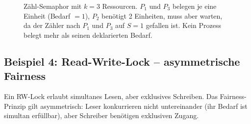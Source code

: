 ﻿\documentclass[a4paper,12pt]{article}
\theoremstyle{definition}
\begin{document}
\begin{figure}[H]
\caption{Zähl-Semaphor mit $k=3$ Ressourcen. $P_1$ und $P_3$ belegen
  je eine Einheit (Bedarf $= 1$), $P_2$ benötigt 2 Einheiten, muss
  aber warten, da der Zähler nach $P_1$ und $P_3$ auf $S=1$ gefallen
  ist. Kein Prozess belegt mehr als seinen deklarierten Bedarf.}
\label{fig:tikz3}
\end{figure}

\subsection{Beispiel 4: Read-Write-Lock -- asymmetrische Fairness}

Ein RW-Lock erlaubt simultanes Lesen, aber exklusives Schreiben.
Das Fairness-Prinzip gilt asymmetrisch: Leser konkurrieren nicht
untereinander (ihr Bedarf ist simultan erfüllbar), aber Schreiber
benötigen exklusiven Zugang.
\end{document}

